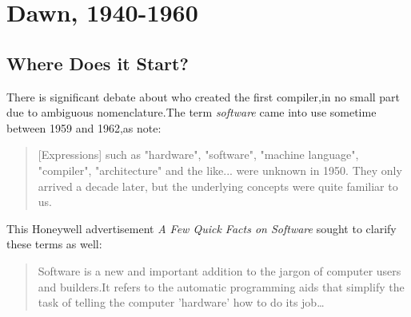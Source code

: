 \chapter{Dawn, 1940-1960}
\section{Where Does it Start?}
There is significant debate about who created the first compiler,in no small
part due to ambiguous nomenclature.The term \textit{software} came into use
sometime between 1959 and 1962,as \citeauthor{the-first-computers-2002} note:
\begin{quotation}
  [Expressions] such as "hardware", "software", "machine language",
  "compiler", "architecture" and the like... were unknown in 1950.
  They only arrived a decade later, but the underlying concepts were
  quite familiar to us.
  \cite{the-first-computers-2002}
\end{quotation}

This Honeywell advertisement \textit{A Few Quick Facts on Software} sought to
clarify these terms as well:

\begin{quotation}
  Software is a new and important addition to the jargon of computer
  users and builders.It refers to the automatic programming aids that
  simplify the task of telling the computer 'hardware' how to do its
  job\dots
  \cite[ch.5]{new-history-of-modern-computing}
\end{quotation}

